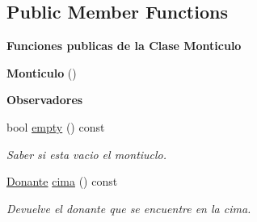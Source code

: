 \subsection*{Public Member Functions}
\begin{Indent}{\bf Funciones publicas de la Clase Monticulo}\par
\begin{DoxyCompactItemize}
\item 
{\bfseries Monticulo} ()\hypertarget{classed_1_1Monticulo_a1de9bee04b411ae5f9a05f12197877ba}{}\label{classed_1_1Monticulo_a1de9bee04b411ae5f9a05f12197877ba}

\end{DoxyCompactItemize}
\end{Indent}
\begin{Indent}{\bf Observadores}\par
\begin{DoxyCompactItemize}
\item 
bool \hyperlink{classed_1_1Monticulo_ac5d5bd797bbac6fc203a70693135e07a}{empty} () const 
\begin{DoxyCompactList}\small\item\em Saber si esta vacio el montiuclo. \end{DoxyCompactList}\item 
\hyperlink{classed_1_1Donante}{Donante} \hyperlink{classed_1_1Monticulo_a0eb6ea094e966a797dc8234ec2c8d924}{cima} () const 
\begin{DoxyCompactList}\small\item\em Devuelve el donante que se encuentre en la cima. \end{DoxyCompactList}\end{DoxyCompactItemize}
\end{Indent}
